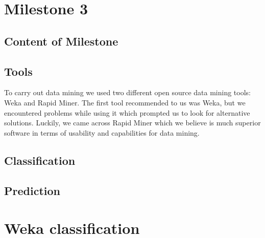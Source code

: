 


\chapter{Milestone 3} \label{cha:ml3}
    \section{Content of Milestone} 
        \label{sec:ml3_content}
    

    \section{Tools} %
    \label{sub:Tools}
    To carry out data mining we used two different open source data mining tools: Weka and Rapid Miner. The first tool recommended to us was Weka, but we encountered problems while using it which prompted us to look for alternative solutions. Luckily, we came across Rapid Miner which we believe is much superior software in terms of usability and capabilities for data mining.
    
    

    \section{Classification} %
    \label{sec:Classification}
    

    \section{Prediction} %
    \label{sub:Prediction}
    

    \appendix
    \chapter{Weka classification} %
    \label{cha:Weka}
    
    


